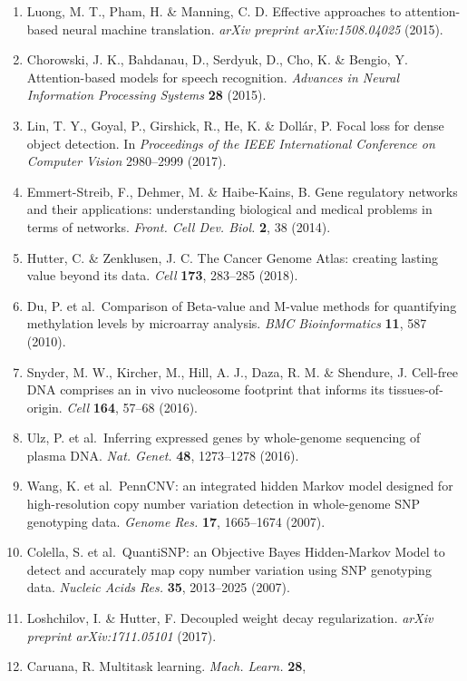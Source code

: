 \begin{enumerate}
{  arXiv:1409.0473} (2014).
\item
  Luong, M. T., Pham, H. \& Manning, C. D. Effective approaches to
  attention-based neural machine translation. \emph{arXiv preprint
  arXiv:1508.04025} (2015).
\item
  Chorowski, J. K., Bahdanau, D., Serdyuk, D., Cho, K. \& Bengio, Y.
  Attention-based models for speech recognition. \emph{Advances in
  Neural Information Processing Systems} \textbf{28} (2015).
\item
  Lin, T. Y., Goyal, P., Girshick, R., He, K. \& Dollár, P. Focal loss
  for dense object detection. In \emph{Proceedings of the IEEE
  International Conference on Computer Vision} 2980--2999 (2017).
\item
  Emmert-Streib, F., Dehmer, M. \& Haibe-Kains, B. Gene regulatory
  networks and their applications: understanding biological and medical
  problems in terms of networks. \emph{Front. Cell Dev. Biol.}
  \textbf{2}, 38 (2014).
\item
  Hutter, C. \& Zenklusen, J. C. The Cancer Genome Atlas: creating
  lasting value beyond its data. \emph{Cell} \textbf{173}, 283--285
  (2018).
\item
  Du, P. et al.~Comparison of Beta-value and M-value methods for
  quantifying methylation levels by microarray analysis. \emph{BMC
  Bioinformatics} \textbf{11}, 587 (2010).
\item
  Snyder, M. W., Kircher, M., Hill, A. J., Daza, R. M. \& Shendure, J.
  Cell-free DNA comprises an in vivo nucleosome footprint that informs
  its tissues-of-origin. \emph{Cell} \textbf{164}, 57--68 (2016).
\item
  Ulz, P. et al.~Inferring expressed genes by whole-genome sequencing of
  plasma DNA. \emph{Nat. Genet.} \textbf{48}, 1273--1278 (2016).
\item
  Wang, K. et al.~PennCNV: an integrated hidden Markov model designed
  for high-resolution copy number variation detection in whole-genome
  SNP genotyping data. \emph{Genome Res.} \textbf{17}, 1665--1674
  (2007).
\item
  Colella, S. et al.~QuantiSNP: an Objective Bayes Hidden-Markov Model
  to detect and accurately map copy number variation using SNP
  genotyping data. \emph{Nucleic Acids Res.} \textbf{35}, 2013--2025
  (2007).
\item
  Loshchilov, I. \& Hutter, F. Decoupled weight decay regularization.
  \emph{arXiv preprint arXiv:1711.05101} (2017).
\item
  Caruana, R. Multitask learning. \emph{Mach. Learn.} \textbf{28},

\end{enumerate}
